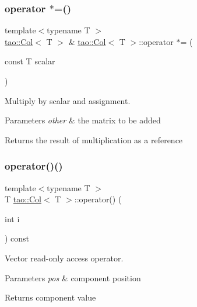 \subsubsection{\texorpdfstring{operator $\ast$=()}{operator *=()}\hspace{0.1cm}{\footnotesize\ttfamily [2/2]}}
{\footnotesize\ttfamily template$<$typename T $>$ \\
\mbox{\hyperlink{classtao_1_1_col}{tao\+::\+Col}}$<$ T $>$ \& \mbox{\hyperlink{classtao_1_1_col}{tao\+::\+Col}}$<$ T $>$\+::operator $\ast$= (\begin{DoxyParamCaption}\item[{const T}]{scalar }\end{DoxyParamCaption})}



Multiply by scalar and assignment. 


\begin{DoxyParams}{Parameters}
{\em other} & the matrix to be added \\
\hline
\end{DoxyParams}
\begin{DoxyReturn}{Returns}
the result of multiplication as a reference 
\end{DoxyReturn}
\mbox{\label{classtao_1_1_col_a7d08ac2d077bed978eb783b5fe707a7c}} 
\subsubsection{\texorpdfstring{operator()()}{operator()()}\hspace{0.1cm}{\footnotesize\ttfamily [1/2]}}
{\footnotesize\ttfamily template$<$typename T $>$ \\
T \mbox{\hyperlink{classtao_1_1_col}{tao\+::\+Col}}$<$ T $>$\+::operator() (\begin{DoxyParamCaption}\item[{int}]{i }\end{DoxyParamCaption}) const}



Vector read-\/only access operator. 


\begin{DoxyParams}{Parameters}
{\em pos} & component position \\
\hline
\end{DoxyParams}
\begin{DoxyReturn}{Returns}
component value 
\end{DoxyReturn}
\mbox{\label{classtao_1_1_col_ad7f3279e2764f5e1b0762e62517e738a}} 
